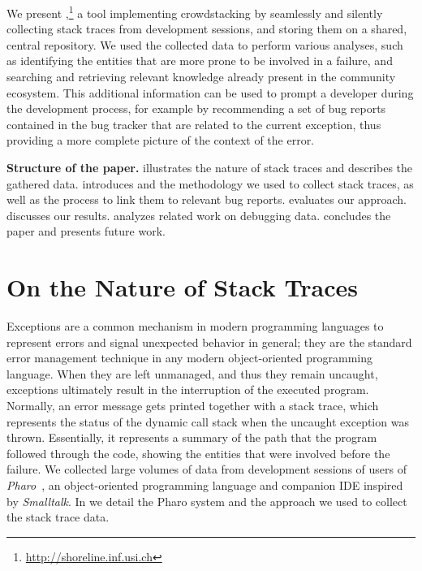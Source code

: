 We present \shr,\footnote{\url{http://shoreline.inf.usi.ch}} a tool implementing crowdstacking by seamlessly and silently collecting stack traces from development sessions, and storing them on a shared, central repository. We used the collected data to perform various analyses, such as identifying the entities that are more prone to be involved in a failure, and searching and retrieving relevant knowledge already present in the community ecosystem. This additional information can be used to prompt a developer during the development process, for example by recommending  a set of bug reports contained in the bug tracker that are related to the current exception, thus providing a more complete picture of the context of the error. 

\textbf{Structure of the paper.}  illustrates the nature of stack traces and describes the gathered data.  introduces \shr and the methodology we used to collect stack traces, as well as the process to link them to relevant bug reports.  evaluates our approach.  discusses our results.  analyzes related work on debugging data.  concludes the paper and presents future work.



\section{On the Nature of Stack Traces} \label{sec:stacktraces}

Exceptions are a common mechanism in modern programming languages to represent errors and signal unexpected behavior in general; they are the standard error management technique in any modern object-oriented programming language. When they are left unmanaged, and thus they remain uncaught, exceptions ultimately result in the interruption of the executed program. Normally, an error message gets printed together with a stack trace, which represents the status of the dynamic call stack when the uncaught exception was thrown. Essentially, it represents a summary of the path that the program followed through the code, showing the entities that were involved before the failure. We collected large volumes of data from development sessions of users of \textit{Pharo}~\cite{black2009}, an object-oriented programming language  and companion IDE inspired by \textit{Smalltalk}. In  we detail the Pharo system and the approach we used to collect the stack trace data.

